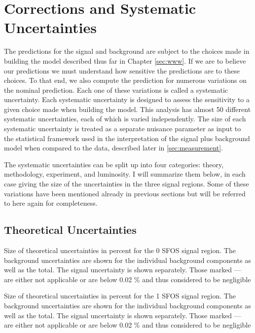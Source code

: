\section{Corrections and Systematic Uncertainties}
\label{sec:systematics}

The predictions for the signal and background are subject
to the choices made in building the model described thus
far in Chapter \ref{sec:www}. If we are to believe our predictions
we must understand how sensitive the predictions are to these choices.
To that end, we also compute the prediction for numerous variations
on the nominal prediction. 
Each one of these variations is called a systematic uncertainty. 
Each systematic uncertainty is designed to assess the sensitivity
to a given choice made when building the model. 
This analysis has almost 50 different systematic
uncertainties, each of which is varied independently. The size of 
each systematic uncertainty
is treated as a separate nuisance parameter
as input to the statistical framework used in the interpretation of the 
signal plus background model
when compared to the data, described later in \sec\ref{sec:measurement}.

The systematic uncertainties can be split up into four categories:
theory, methodology, experiment, and luminosity. 
I will summarize them below, in each case giving the 
size of the uncertainties in the three signal regions. 
Some of these variations have 
been mentioned already in previous sections but will be
referred to here again for completeness.

\subsection{Theoretical Uncertainties}




\begin{table}[ht]
\centering

\caption{Size of theoretical uncertainties in percent for the 0 SFOS signal region. The background uncertainties are shown for the individual background components as well as the total. The signal uncertainty is shown separately. Those marked --- are either not applicable or are below 0.02 \% and thus considered to be negligible}
\label{tab:sys_theory_0sfos}
\end{table}

\begin{table}[ht]
\centering

\caption{Size of theoretical uncertainties in percent for the 1 SFOS signal region. The background uncertainties are shown for the individual background components as well as the total. The signal uncertainty is shown separately. Those marked --- are either not applicable or are below 0.02 \% and thus considered to be negligible}
\label{tab:sys_theory_1sfos}
\end{table}


